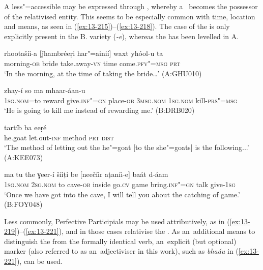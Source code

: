 A less"=accessible   may be expressed through , whereby a~ becomes the possessor of the relativised entity. This seems to be especially common with time, location and means, as seen in (\ref{ex:13-215})--(\ref{ex:13-218}). The  case of the  is only explicitly present in the B. variety (\textit{-e}), whereas the  has been levelled in A.

\begin{exe}
\ex
\label{ex:13-215}
\gll rhootašíi-a [ǰhambréeṛi har"=ainií] waxt  yhóol-u ta \\
morning-\textsc{ob} bride take.away-\textsc{vn} time come.\textsc{pfv"=msg} \textsc{prt} \\
\glt `In the morning, at the time of taking the bride{\ldots}' (A:GHU010)

\ex
\label{ex:13-216}
\gll [máa=the bašéš deníi-e] zhay-í so  ma mhaar-áan-u \\
\textsc{1sg.nom}=to reward give.\textsc{inf"=gn} place-\textsc{ob} \textsc{3msg.nom} \textsc{1sg.nom} kill-\textsc{prs"=msg} \\
\glt `He is going to kill me instead of rewarding me.' (B:DRB020)

\ex
\label{ex:13-217}
 tartíb ba eeṛé  \\
he.goat let.out-\textsc{inf} method \textsc{prt} \textsc{dist} \\
\glt `The method of letting out the he"=goat [to the she"=goats] is the following...' (A:KEE073)

\ex
\label{ex:13-218}
\gll ma tu the ɣeer-í šíiṭi be [neečíir  aṭaníi-e] baát d-áam \\
\textsc{1sg.nom} \textsc{2sg.nom} to cave-\textsc{ob} inside go.\textsc{cv} game  bring.\textsc{inf"=gn} talk give-\textsc{1sg} \\
\glt `Once we have got into the cave, I will tell you about the catching of game.' (B:FOY048) 
\end{exe}

Less commonly, Perfective Participials may be used attributively, as in (\ref{ex:13-219})--(\ref{ex:13-221}), and in those cases relativise the . As an~additional means to distinguish the  from the formally identical   verb, an~explicit (but optional)  marker (also referred to as an~adjectiviser in this work), such as \textit{bhaáu} in (\ref{ex:13-221}), can be used.


